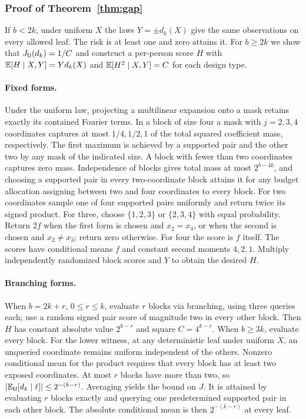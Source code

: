 \subsubsection{Proof of Theorem~\ref{thm:gap}}\label{app:gap}
If $b<2k$, under uniform $X$ the laws $Y=\pm d_k(X)$ give the same observations on every allowed leaf. The risk is at least one and zero attains it. For $b\ge2k$ we show that $J_\mathsf U(d_k)=1/C$ and construct a per-person score $H$ with $\mathbb{E}[H\mid X,Y]=Yd_k(X)$ and $\mathbb{E}[H^2\mid X,Y]=C$ for each design type.

\paragraph{Fixed forms.}
Under the uniform law, projecting a multilinear expansion onto a mask retains exactly its contained Fourier terms. In a block of size four a mask with $j=2,3,4$ coordinates captures at most $1/4,1/2,1$ of the total squared coefficient mass, respectively. The first maximum is achieved by a supported pair and the other two by any mask of the indicated size. A block with fewer than two coordinates captures zero mass. Independence of blocks gives total mass at most $2^{b-4k}$, and choosing a supported pair in every two-coordinate block attains it for any budget allocation assigning between two and four coordinates to every block. For two coordinates sample one of four supported pairs uniformly and return twice its signed product. For three, choose $\{1,2,3\}$ or $\{2,3,4\}$ with equal probability. Return $2f$ when the first form is chosen and $x_2=x_3$, or when the second is chosen and $x_2\ne x_3$; return zero otherwise. For four the score is $f$ itself. The scores have conditional means $f$ and constant second moments $4,2,1$. Multiply independently randomized block scores and $Y$ to obtain the desired $H$.

\paragraph{Branching forms.}
When $b=2k+r$, $0\le r\le k$, evaluate $r$ blocks via branching, using three queries each; use a random signed pair score of magnitude two in every other block. Then $H$ has constant absolute value $2^{k-r}$ and square $C=4^{k-r}$. When $b\ge3k$, evaluate every block. For the lower witness, at any deterministic leaf under uniform $X$, an unqueried coordinate remains uniform independent of the others. Nonzero conditional mean for the product requires that every block has at least two exposed coordinates. At most $r$ blocks have more than two, so $|\mathbb{E}_\mathsf U[d_k\mid\ell]|\le2^{-(k-r)}$. Averaging yields the bound on $J$. It is attained by evaluating $r$ blocks exactly and querying one predetermined supported pair in each other block. The absolute conditional mean is then $2^{-(k-r)}$ at every leaf.

